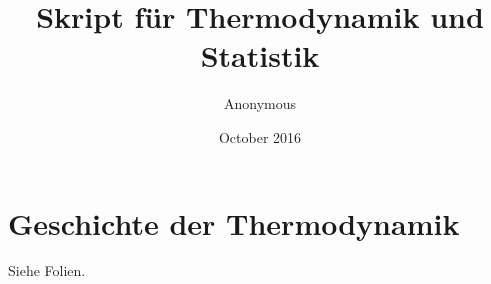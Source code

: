 
\title{Skript für Thermodynamik und Statistik}
\author{Anonymous}
\date{October 2016}

%



\maketitle
\tableofcontents
\newpage

\section{Geschichte der Thermodynamik}
Siehe Folien.










